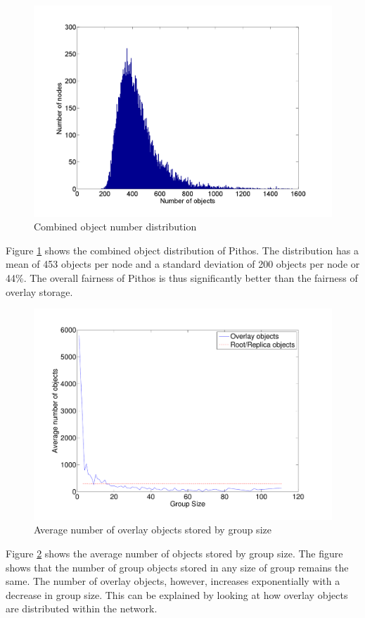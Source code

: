 \documentclass[10pt,a4paper,conference]{IEEEtran}
\begin{document}
\begin{figure}[htbp]
 \centering
 \includegraphics[clip=true, viewport=1.5cm 1.2cm 27cm 19.7cm, width=\columnwidth]{Objects}
 \caption{Combined object number distribution}
 \label{fig_objects}
\end{figure}
%
Figure \ref{fig_objects} shows the combined object distribution of Pithos. The distribution has a mean of 453 objects per node and a standard
deviation of 200 objects per node or 44\%. The overall fairness of Pithos is thus significantly better than the fairness of overlay storage.

\begin{figure}[htbp]
 \centering
 \includegraphics[clip=true, viewport=1.5cm 1cm 27cm 19.5cm, width=\columnwidth]{ObjectsByGroupSize}
 \caption{Average number of overlay objects stored by group size}
 \label{fig_objects_by_groupsize}
\end{figure}
%
Figure \ref{fig_objects_by_groupsize} shows the average number of objects stored by group size. The figure shows that the number of group objects
stored in any size of group remains the same. The number of overlay objects, however, increases exponentially with a decrease in group size. This can
be explained by looking at how overlay objects are distributed within the network. %
\end{document}
